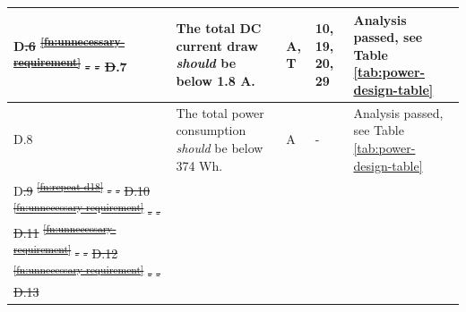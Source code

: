 \documentclass[a4paper,12pt,twoside]{article}
\providecommand{\DIFdeltex}[1]{{\protect\color{red}\sout{#1}}}                      %
\providecommand{\DIFdelbegin}{} %
\providecommand{\DIFdelend}{} %
\providecommand{\DIFdel}[1]{\texorpdfstring{\DIFdeltex{#1}}{}} %
\newcommand{\DIFscaledelfig}{0.5}
\newlength{\DIFdelgraphicswidth} %
\newlength{\DIFdelgraphicsheight} %
\newcommand{\DIFdelincludegraphics}[2][]{%
\sbox{\DIFdelgraphicsbox}{\DIFOincludegraphics[#1]{#2}}%
\settoboxwidth{\DIFdelgraphicswidth}{\DIFdelgraphicsbox} %
\settoboxtotalheight{\DIFdelgraphicsheight}{\DIFdelgraphicsbox} %
\scalebox{\DIFscaledelfig}{%
\parbox[b]{\DIFdelgraphicswidth}{\usebox{\DIFdelgraphicsbox}\\[-\baselineskip] \rule{\DIFdelgraphicswidth}{0em}}\llap{\resizebox{\DIFdelgraphicswidth}{\DIFdelgraphicsheight}{%
\setlength{\unitlength}{\DIFdelgraphicswidth}%
\begin{picture}(1,1)%
\thicklines\linethickness{2pt} %
{\color[rgb]{1,0,0}\put(0,0){\framebox(1,1){}}}%
{\color[rgb]{1,0,0}\put(0,0){\line( 1,1){1}}}%
{\color[rgb]{1,0,0}\put(0,1){\line(1,-1){1}}}%
\end{picture}%
}\hspace*{3pt}}} %
} %
\DeclareRobustCommand{\DIFdelbegin}{\DIFOdelbegin \let\includegraphics\DIFdelincludegraphics} %
\DeclareRobustCommand{\DIFdelend}{\DIFOaddend \let\includegraphics\DIFOincludegraphics} %
\begin{document}
\begin{longtable}[]{|m{}| m{} |m{} |m{}|m{}|}
D\DIFdelbegin \DIFdel{.6  }%
\DIFdel{\textsuperscript{\ref{fn:unnecessary-requirement}}                                                                                                       }%
\DIFdel{-      }%
\DIFdel{-           }%
\DIFdel{D}\DIFdelend .7  & The total DC current draw \textit{should} be below 1.8 A. &      A, T        & 10, 19, 20, 29            & Analysis passed, see Table \ref{tab:power-design-table}        \\ \hline
D.8  & The total power consumption \textit{should} be below 374 Wh.& A & - & Analysis passed, see Table \ref{tab:power-design-table} \\ \hline
D\DIFdelbegin \DIFdel{.9  }%
\DIFdel{\textsuperscript{\ref{fn:repeat-d18}} }%
\DIFdel{- }%
\DIFdel{- }%
\DIFdel{D.10 }%
\DIFdel{\textsuperscript{\ref{fn:unnecessary-requirement}}                                                                                          }%
\DIFdel{-     }%
\DIFdel{-           }%
\DIFdel{D.11 }%
\DIFdel{\textsuperscript{\ref{fn:unnecessary-requirement}}                                                                                                               }%
\DIFdel{-    }%
\DIFdel{-            }%
\DIFdel{D.12 }%
\DIFdel{\textsuperscript{\ref{fn:unnecessary-requirement}}                                                                                                }%
\DIFdel{-       }%
\DIFdel{-           }%
\DIFdel{D.13 }%

\end{longtable}
\end{document}
